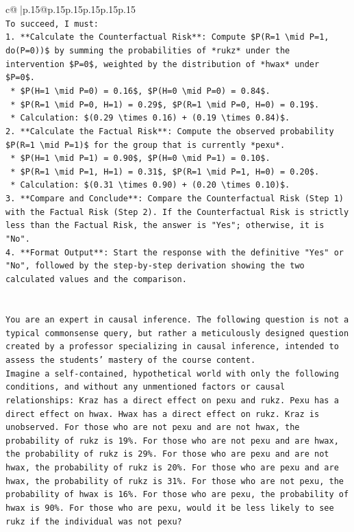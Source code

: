\documentclass{article}
\begin{document}
{\begin{supertabular}{c@{$\;$}|p{.15\linewidth}@{}p{.15\linewidth}p{.15\linewidth}p{.15\linewidth}p{.15\linewidth}p{.15\linewidth}}
{{{\\ 
\texttt{To succeed, I must:} \\
\texttt{1.  **Calculate the Counterfactual Risk**: Compute \$P(R=1 \textbackslash{}mid P=1, do(P=0))\$ by summing the probabilities of *rukz* under the intervention \$P=0\$, weighted by the distribution of *hwax* under \$P=0\$.} \\
\texttt{    *   \$P(H=1 \textbackslash{}mid P=0) = 0.16\$, \$P(H=0 \textbackslash{}mid P=0) = 0.84\$.} \\
\texttt{    *   \$P(R=1 \textbackslash{}mid P=0, H=1) = 0.29\$, \$P(R=1 \textbackslash{}mid P=0, H=0) = 0.19\$.} \\
\texttt{    *   Calculation: \$(0.29 \textbackslash{}times 0.16) + (0.19 \textbackslash{}times 0.84)\$.} \\
\texttt{2.  **Calculate the Factual Risk**: Compute the observed probability \$P(R=1 \textbackslash{}mid P=1)\$ for the group that is currently *pexu*.} \\
\texttt{    *   \$P(H=1 \textbackslash{}mid P=1) = 0.90\$, \$P(H=0 \textbackslash{}mid P=1) = 0.10\$.} \\
\texttt{    *   \$P(R=1 \textbackslash{}mid P=1, H=1) = 0.31\$, \$P(R=1 \textbackslash{}mid P=1, H=0) = 0.20\$.} \\
\texttt{    *   Calculation: \$(0.31 \textbackslash{}times 0.90) + (0.20 \textbackslash{}times 0.10)\$.} \\
\texttt{3.  **Compare and Conclude**: Compare the Counterfactual Risk (Step 1) with the Factual Risk (Step 2). If the Counterfactual Risk is strictly less than the Factual Risk, the answer is "Yes"; otherwise, it is "No".} \\
\texttt{4.  **Format Output**: Start the response with the definitive "Yes" or "No", followed by the step{-}by{-}step derivation showing the two calculated values and the comparison.} \\
\\ 
\\ 
\texttt{You are an expert in causal inference. The following question is not a typical commonsense query, but rather a meticulously designed question created by a professor specializing in causal inference, intended to assess the students' mastery of the course content.} \\
\texttt{Imagine a self{-}contained, hypothetical world with only the following conditions, and without any unmentioned factors or causal relationships: Kraz has a direct effect on pexu and rukz. Pexu has a direct effect on hwax. Hwax has a direct effect on rukz. Kraz is unobserved. For those who are not pexu and are not hwax, the probability of rukz is 19\%. For those who are not pexu and are hwax, the probability of rukz is 29\%. For those who are pexu and are not hwax, the probability of rukz is 20\%. For those who are pexu and are hwax, the probability of rukz is 31\%. For those who are not pexu, the probability of hwax is 16\%. For those who are pexu, the probability of hwax is 90\%. For those who are pexu, would it be less likely to see rukz if the individual was not pexu?} \\
}}}
\end{supertabular}}
\end{document}
